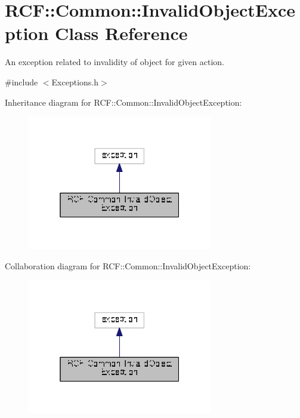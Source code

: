 \hypertarget{class_r_c_f_1_1_common_1_1_invalid_object_exception}{}\section{R\+C\+F\+:\+:Common\+:\+:Invalid\+Object\+Exception Class Reference}
\label{class_r_c_f_1_1_common_1_1_invalid_object_exception}


An exception related to invalidity of object for given action.  




{\ttfamily \#include $<$Exceptions.\+h$>$}



Inheritance diagram for R\+C\+F\+:\+:Common\+:\+:Invalid\+Object\+Exception\+:\nopagebreak
\begin{figure}[H]
\begin{center}
\leavevmode
\includegraphics[width=229pt]{class_r_c_f_1_1_common_1_1_invalid_object_exception__inherit__graph}
\end{center}
\end{figure}


Collaboration diagram for R\+C\+F\+:\+:Common\+:\+:Invalid\+Object\+Exception\+:\nopagebreak
\begin{figure}[H]
\begin{center}
\leavevmode
\includegraphics[width=229pt]{class_r_c_f_1_1_common_1_1_invalid_object_exception__coll__graph}
\end{center}
\end{figure}
